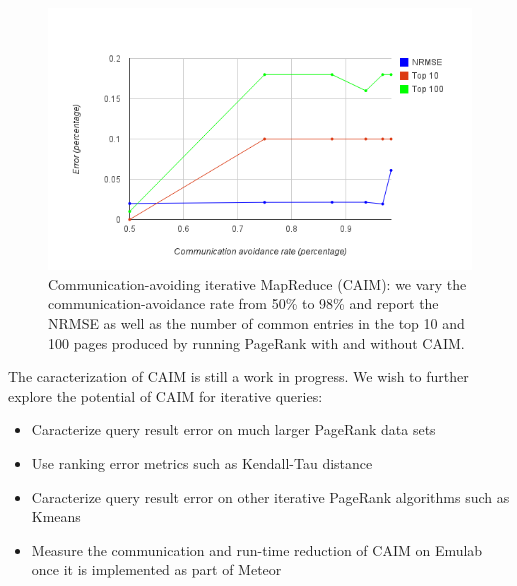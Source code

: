 \begin{figure}[!ht]
\centering\includegraphics[width=\columnwidth]{figs/comm_avoid_PR.png}
\vspace{-1.8em}
\caption{Communication-avoiding iterative MapReduce (CAIM): we vary the communication-avoidance rate from 50\% to 98\% and report the NRMSE as well as the number of common entries in the top 10 and 100 pages produced by running PageRank with and without CAIM.}
\label{fig:CAIM}
\vspace{.7em}
\end{figure}

The caracterization of CAIM is still a work in progress. We wish to further explore the potential of CAIM for iterative queries: 

\begin{itemize}

\item Caracterize query result error on much larger PageRank data sets
\item Use ranking error metrics such as Kendall-Tau distance
\item Caracterize query result error on other iterative PageRank algorithms such as Kmeans
\item Measure the communication and run-time reduction of CAIM on Emulab once it is implemented as part of Meteor

\end{itemize}
